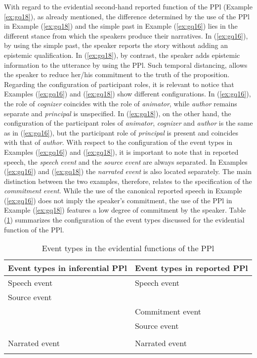 \documentclass[output=paper]{langsci/langscibook}
\begin{document}
 With regard to the evidential second-hand reported function of the PPl (Example \ref{ex:gq18}), as already mentioned, the difference determined by the use of the PPl in Example (\ref{ex:gq18}) and the simple past in Example (\ref{ex:gq16}) lies in the different stance from which the speakers produce their narratives. In (\ref{ex:gq16}), by using the simple past, the speaker reports the story without adding an epistemic qualification. In (\ref{ex:gq18}), by contrast, the speaker adds epistemic information to the utterance by using the PPl. Such temporal distancing, allows the speaker to reduce her/his commitment to the truth of the proposition. Regarding the configuration of participant roles, it is relevant to notice that Examples (\ref{ex:gq16}) and (\ref{ex:gq18}) show different configurations. In (\ref{ex:gq16}), the role of \textit{cognizer} coincides with the role of \textit{animator}, while \textit{author} remains separate and \textit{principal} is unspecified. In (\ref{ex:gq18}), on the other hand, the configuration of the participant roles of \textit{animator}, \textit{cognizer} and \textit{author} is the same as in (\ref{ex:gq16}), but the participant role of \textit{principal} is present and coincides with that of \textit{author}. With respect to the configuration of the event types in Examples (\ref{ex:gq16}) and (\ref{ex:gq18}), it is important to note that in reported speech, the \textit{speech} \textit{event} and the \textit{source} \textit{event} are always separated. In Examples (\ref{ex:gq16}) and (\ref{ex:gq18}) the \textit{narrated} \textit{event} is also located separately. The main distinction between the two examples, therefore, relates to the specification of the \textit{commitment} \textit{event}. While the use of the canonical reported speech in Example (\ref{ex:gq16}) does not imply the speaker’s commitment, the use of the PPl in Example (\ref{ex:gq18}) features a low degree of commitment by the speaker. Table (\ref{tab:fig:gq4}) summarizes the configuration of the event types discussed for the evidential function of the PPl. 

\begin{table}
\begin{tabularx}{.8\textwidth}{Xl}
\lsptoprule
Event types in inferential PPl & Event types in reported PPl \\
\midrule
Speech event & Speech event\\
Source event & \\
& Commitment event\\
& Source event\\
& \\
Narrated event & Narrated event\\
\lspbottomrule
\end{tabularx}
\caption{Event types in the evidential functions of the PPl}
\label{tab:fig:gq4}
\end{table}
\end{document}
